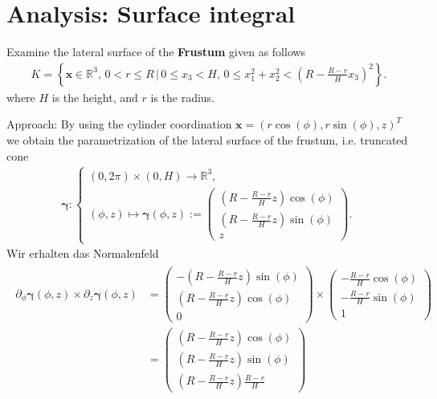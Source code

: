 \documentclass[12pt]{article}
\begin{document}
\section{Analysis: Surface integral}
\begin{exampleboxed}
	Examine the lateral surface of the \textbf{Frustum} given as follows
	\begin{align*}
		K =
		\left\{
		\bm{x} \in \mathbb{R}^3,\,
		0 < r \leq R
		\, \Bigg| \,
		0 \leq x_3 < H,\,
		0 \leq x_1^2 + x_2^2 <
		\left(R - \frac{R-r}{H} x_3\right)^2
		\right\}.
	\end{align*}
	where $H$ is the height, and $r$ is the radius.
\end{exampleboxed}
Approach:
By using the cylinder coordination 
$\bm{x} = (r \cos (\phi), r \sin(\phi),z)^T$
we obtain the parametrization of the lateral surface of the frustum,
i.e. truncated cone
\begin{align*}
	\bm{\gamma}: 
	\begin{cases}
		(0,2\pi)\times (0,H) \to \mathbb{R}^3,\\
		(\phi,z) \mapsto \bm{\gamma}(\phi,z) :=
	\begin{pmatrix} \left(R - \frac{R-r}{H}z\right) \cos(\phi) \\
		\left(R - \frac{R-r}{H}z\right) \sin(\phi) \\
		z
	\end{pmatrix}.
	\end{cases}
\end{align*}
Wir erhalten das Normalenfeld
\begin{align*}
	\boxed{
		\begin{aligned}
			\partial_{\phi} \bm{\gamma}(\phi,z)\times \partial_z \bm{\gamma}(\phi,z)
			 & = \begin{pmatrix} -\left(R - \frac{R-r}{H}z\right) \sin(\phi) \\
				     \left(R - \frac{R-r}{H}z\right) \cos(\phi)  \\
				     0
			     \end{pmatrix}
			\times
			\begin{pmatrix}
				-\frac{R-r}{H}\cos(\phi) \\-\frac{R-r}{H} \sin(\phi)\\1
			\end{pmatrix}             \\
			 & = \begin{pmatrix}
				     \left(R- \frac{R-r}{H}z\right)\cos(\phi) \\
				     \left(R- \frac{R-r}{H}z\right)\sin(\phi) \\
				     \left(R- \frac{R-r}{H}z\right)\frac{R-r}{H}
			     \end{pmatrix}
		\end{aligned}
	}
\end{align*}
\end{document}
